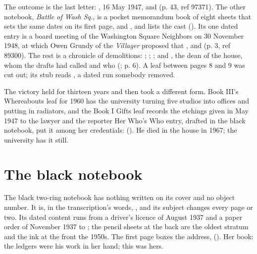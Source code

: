 The outcome is the last letter: , 16 May 1947, and  (p. 43, ref 97371). The other notebook, \emph{Battle of Wash Sq.}, is a pocket memorandum book of eight sheets that sets the same dates on its first page,  and , and lists the cast (). Its one dated entry is a board meeting of the Washington Square Neighbors on 30 November 1948, at which Owen Grundy of the \emph{Villager} proposed that , and  (p. 3, ref 89300). The rest is a chronicle of demolitions: ; ; ; and , the dean of the house, whom the drafts had called  and who  (; p. 6). A leaf between pages 8 and 9 was cut out; its stub reads , a dated run somebody removed.

The victory held for thirteen years and then took a different form. Book III's Whereabouts leaf for 1960 has the university turning five studios into offices and putting in radiators, and the Book I Gifts leaf records the etchings given in May 1947 to the lawyer and the reporter  Her Who's Who entry, drafted in the black notebook, put it among her credentials:  (). He died in the house in 1967; the university has it still.

\section{The black notebook}

The black two-ring notebook has nothing written on its cover and no object number. It is, in the transcription's words, , and its subject changes every page or two. Its dated content runs from a driver's licence of August 1937 and a paper order of November 1937 to ; the pencil sheets at the back are the oldest stratum and the ink at the front the 1950s. The first page boxes the address,  (). Her book: the ledgers were his work in her hand; this was hers.

